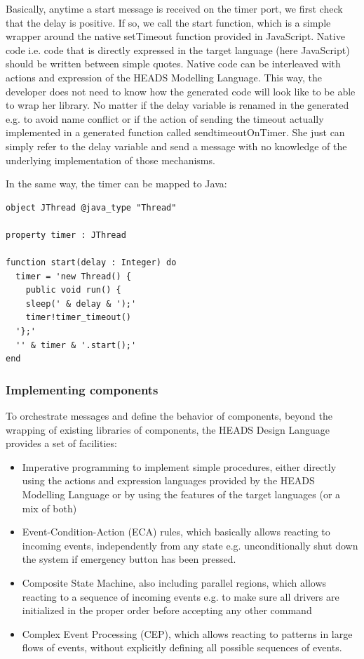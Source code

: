 Basically, anytime a start message is received on the timer port, we first check that the delay is positive. If so, we call the start function, which is a simple wrapper around the native setTimeout function provided in JavaScript. Native code i.e. code that is directly expressed in the target language (here JavaScript) should be written between simple quotes. Native code can be interleaved with actions and expression of the HEADS Modelling Language. This way, the developer does not need to know how the generated code will look like to be able to wrap her library. No matter if the delay variable is renamed in the generated e.g. to avoid name conflict or if the action of sending the timeout actually implemented in a generated function called sendtimeoutOnTimer. She just can simply refer to the delay variable and send a message with no knowledge of the underlying implementation of those mechanisms. 

In the same way, the timer can be mapped to Java:

\begin{lstlisting}
object JThread @java_type "Thread" 

property timer : JThread 

function start(delay : Integer) do  
  timer = 'new Thread() { 
    public void run() { 
    sleep(' & delay & ');' 
    timer!timer_timeout() 
  '};' 
  '' & timer & '.start();' 
end 
\end{lstlisting} 

\subsubsection{Implementing components}

To orchestrate messages and define the behavior of components, beyond the wrapping of existing libraries of components, the HEADS Design Language provides a set of facilities: 
\begin{itemize}
\item Imperative programming to implement simple procedures, either directly using the actions and expression languages provided by the HEADS Modelling Language or by using the features of the target languages (or a mix of both) 
\item Event-Condition-Action (ECA) rules, which basically allows reacting to incoming events, independently from any state e.g. unconditionally shut down the system if emergency button has been pressed.  
\item Composite State Machine, also including parallel regions, which allows reacting to a sequence of incoming events e.g. to make sure all drivers are initialized in the proper order before accepting any other command 
\item Complex Event Processing (CEP), which allows reacting to patterns in large flows of events, without explicitly defining all possible sequences of events.
	\end{itemize}

